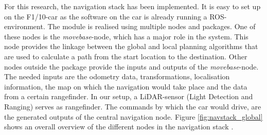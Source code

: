 \documentclass[conference,a4paper]{IEEEtran}
\begin{document}
For this research, the navigation stack has been implemented. It is easy to set up on the F1/10-car as the software on the car is already running a ROS-environment.
The module is realised using multiple nodes and packages. One of these nodes is the \emph{move\textunderscore base}-node, which has a major role in the system. This node provides the linkage between the global and local planning algorithms that are used to calculate a path from the start location to the destination. Other nodes outside the package provide the inputs and outputs of the \emph{move\textunderscore base}-node. The needed inputs are the odometry data, transformations, localisation information, the map on which the navigation would take place and the data from a certain rangefinder. In our setup, a LiDAR-sensor (Light Detection and Ranging) serves as rangefinder. The commands by which the car would drive, are the generated outputs of the central navigation node. Figure \ref{fig:navstack_global} shows an overall overview of the different nodes in the navigation stack \cite{Marder-Eppstein2016}. 
\end{document}
